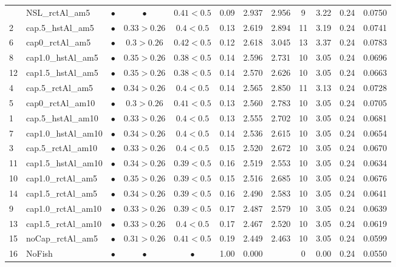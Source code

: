 \documentclass[11pt]{book}
\begin{document}
\begin{landscape}
\begin{longtable}[t]{llcccccccccc}
\midrule
\endhead
\
\endfoot
\bottomrule
\endlastfoot
17 & NSL\_rctAl\_am5 & $\bullet$ & $\bullet$ & $0.41<0.5$ & 0.09 & 2.937 & 2.956 & 9 & 3.22 & 0.24 & 0.0750\\
2 & cap.5\_hstAl\_am5 & $\bullet$ & $0.33>0.26$ & $0.4<0.5$ & 0.13 & 2.619 & 2.894 & 11 & 3.19 & 0.24 & 0.0741\\
6 & cap0\_rctAl\_am5 & $\bullet$ & $0.3>0.26$ & $0.42<0.5$ & 0.12 & 2.618 & 3.045 & 13 & 3.37 & 0.24 & 0.0783\\
8 & cap1.0\_hstAl\_am5 & $\bullet$ & $0.35>0.26$ & $0.38<0.5$ & 0.14 & 2.596 & 2.731 & 10 & 3.05 & 0.24 & 0.0696\\
12 & cap1.5\_hstAl\_am5 & $\bullet$ & $0.35>0.26$ & $0.38<0.5$ & 0.14 & 2.570 & 2.626 & 10 & 3.05 & 0.24 & 0.0663\\
4 & cap.5\_rctAl\_am5 & $\bullet$ & $0.34>0.26$ & $0.4<0.5$ & 0.14 & 2.565 & 2.850 & 11 & 3.13 & 0.24 & 0.0728\\
5 & cap0\_rctAl\_am10 & $\bullet$ & $0.3>0.26$ & $0.41<0.5$ & 0.13 & 2.560 & 2.783 & 10 & 3.05 & 0.24 & 0.0705\\
1 & cap.5\_hstAl\_am10 & $\bullet$ & $0.33>0.26$ & $0.4<0.5$ & 0.13 & 2.555 & 2.702 & 10 & 3.05 & 0.24 & 0.0681\\
7 & cap1.0\_hstAl\_am10 & $\bullet$ & $0.34>0.26$ & $0.4<0.5$ & 0.14 & 2.536 & 2.615 & 10 & 3.05 & 0.24 & 0.0654\\
3 & cap.5\_rctAl\_am10 & $\bullet$ & $0.33>0.26$ & $0.4<0.5$ & 0.15 & 2.520 & 2.672 & 10 & 3.05 & 0.24 & 0.0670\\
11 & cap1.5\_hstAl\_am10 & $\bullet$ & $0.34>0.26$ & $0.39<0.5$ & 0.16 & 2.519 & 2.553 & 10 & 3.05 & 0.24 & 0.0634\\
10 & cap1.0\_rctAl\_am5 & $\bullet$ & $0.35>0.26$ & $0.39<0.5$ & 0.15 & 2.516 & 2.685 & 10 & 3.05 & 0.24 & 0.0676\\
14 & cap1.5\_rctAl\_am5 & $\bullet$ & $0.34>0.26$ & $0.39<0.5$ & 0.16 & 2.490 & 2.583 & 10 & 3.05 & 0.24 & 0.0641\\
9 & cap1.0\_rctAl\_am10 & $\bullet$ & $0.33>0.26$ & $0.39<0.5$ & 0.17 & 2.487 & 2.579 & 10 & 3.05 & 0.24 & 0.0639\\
13 & cap1.5\_rctAl\_am10 & $\bullet$ & $0.33>0.26$ & $0.4<0.5$ & 0.17 & 2.467 & 2.520 & 10 & 3.05 & 0.24 & 0.0619\\
15 & noCap\_rctAl\_am5 & $\bullet$ & $0.31>0.26$ & $0.41<0.5$ & 0.19 & 2.449 & 2.463 & 10 & 3.05 & 0.24 & 0.0599\\
16 & NoFish & $\bullet$ & $\bullet$ & $\bullet$ & 1.00 & 0.000 &  & 0 & 0.00 & 0.24 & 0.0550\\*
\end{longtable}
\end{landscape}
\endgroup{}
\end{document}
